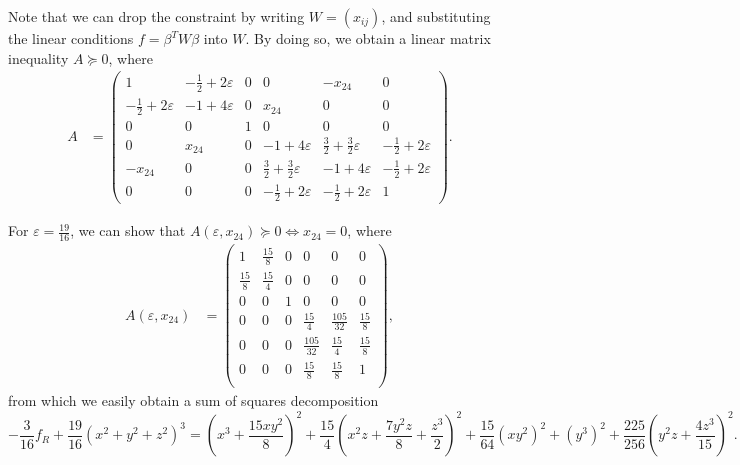 \documentclass[nonacm]{acmart}
\begin{document}
Note that we can drop the constraint by writing $W = (x_{ij})$,
and substituting the linear conditions $f = \beta^T W \beta$ into $W$.
By doing so, we obtain a linear matrix inequality $A \succeq 0$,
where
\begin{align*}
    A & =
    \begin{pmatrix}
        1                         & -\frac{1}{2}+2\varepsilon & 0 & 0                                  & -x_{24}                            & 0                         \\
        -\frac{1}{2}+2\varepsilon & -1+4\varepsilon           & 0 & x_{24}                             & 0                                  & 0                         \\
        0                         & 0                         & 1 & 0                                  & 0                                  & 0                         \\
        0                         & x_{24}                    & 0 & -1+4\varepsilon                    & \frac{3}{2}+\frac{3}{2}\varepsilon & -\frac{1}{2}+2\varepsilon \\
        -x_{24}                   & 0                         & 0 & \frac{3}{2}+\frac{3}{2}\varepsilon & -1+4\varepsilon                    & -\frac{1}{2}+2\varepsilon \\
        0                         & 0                         & 0 & -\frac{1}{2}+2\varepsilon          & -\frac{1}{2}+2\varepsilon          & 1
    \end{pmatrix}.
\end{align*}

For $\varepsilon=\frac{19}{16}$,
we can show that $A(\varepsilon,x_{24}) \succeq 0 \iff x_{24} = 0$,
where
\begin{align*}
    A(\varepsilon,x_{24}) & =
    \begin{pmatrix}
        1            & \frac{15}{8} & 0 & 0              & 0              & 0            \\
        \frac{15}{8} & \frac{15}{4} & 0 & 0              & 0              & 0            \\
        0            & 0            & 1 & 0              & 0              & 0            \\
        0            & 0            & 0 & \frac{15}{4}   & \frac{105}{32} & \frac{15}{8} \\
        0            & 0            & 0 & \frac{105}{32} & \frac{15}{4}   & \frac{15}{8} \\
        0            & 0            & 0 & \frac{15}{8}   & \frac{15}{8}   & 1            \\
    \end{pmatrix},
\end{align*}
from which we easily obtain a sum of squares decomposition
\begin{equation*}
    -\frac{3}{16} f_R + \frac{19}{16} (x^2+y^2+z^2)^3
    = \left(x^3+\frac{15 x y^2}{8}\right)^2+\frac{15}{4}\left(x^2 z+\frac{7 y^2 z}{8}+\frac{z^3}{2}\right)^2+\frac{15}{64}\left(x y^2\right)^2+\left(y^3\right)^2+\frac{225}{256}\left(y^2 z+\frac{4 z^3}{15}\right)^2.
\end{equation*}



\end{document}
